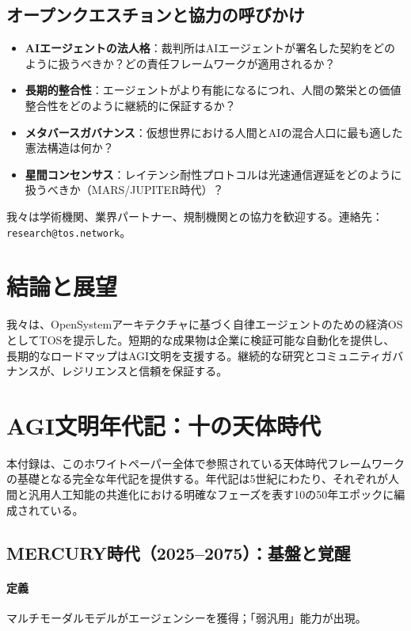 \documentclass[11pt]{article}
\begin{document}
\subsection{オープンクエスチョンと協力の呼びかけ}

\begin{itemize}[noitemsep]
  \item \textbf{AIエージェントの法人格}：裁判所はAIエージェントが署名した契約をどのように扱うべきか？どの責任フレームワークが適用されるか？
  \item \textbf{長期的整合性}：エージェントがより有能になるにつれ、人間の繁栄との価値整合性をどのように継続的に保証するか？
  \item \textbf{メタバースガバナンス}：仮想世界における人間とAIの混合人口に最も適した憲法構造は何か？
  \item \textbf{星間コンセンサス}：レイテンシ耐性プロトコルは光速通信遅延をどのように扱うべきか（MARS/JUPITER時代）？
\end{itemize}

我々は学術機関、業界パートナー、規制機関との協力を歓迎する。連絡先：\texttt{research@tos.network}。

\section{結論と展望}
我々は、OpenSystemアーキテクチャに基づく自律エージェントのための経済OSとしてTOSを提示した。短期的な成果物は企業に検証可能な自動化を提供し、長期的なロードマップはAGI文明を支援する。継続的な研究とコミュニティガバナンスが、レジリエンスと信頼を保証する。

\appendix
\newpage

\section{AGI文明年代記：十の天体時代}
\label{appendix:chronicle}

本付録は、このホワイトペーパー全体で参照されている天体時代フレームワークの基礎となる完全な年代記を提供する。年代記は5世紀にわたり、それぞれが人間と汎用人工知能の共進化における明確なフェーズを表す10の50年エポックに編成されている。

\subsection{MERCURY時代（2025–2075）：基盤と覚醒}
\paragraph{定義} マルチモーダルモデルがエージェンシーを獲得；「弱汎用」能力が出現。
\end{document}
